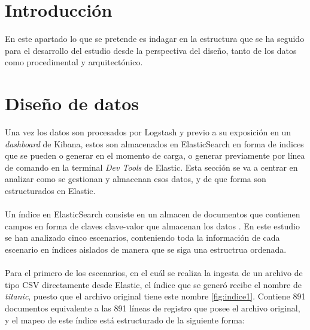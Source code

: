 
\section{Introducción}
En este apartado lo que se pretende es indagar en la estructura que se ha seguido para el desarrollo del estudio desde la perspectiva del diseño, tanto de los datos como procedimental y arquitectónico.

\section{Diseño de datos}
Una vez los datos son procesados por Logstash y previo a su exposición en un \textit{dashboard} de Kibana, estos son almacenados en ElasticSearch en forma de indices que se pueden o generar en el momento de carga, o generar previamente por línea de comando en la terminal \textit{Dev Tools} de Elastic. Esta sección se va a centrar en analizar como se gestionan y almacenan esos datos, y de que forma son estructurados en Elastic.

\paragraph{}

Un índice en ElasticSearch consiste en un almacen de documentos que contienen campos en forma de claves clave-valor que almacenan los datos \cite{indices}. En este estudio se han analizado cinco escenarios, conteniendo toda la información de cada escenario en índices aislados de manera que se siga una estructrua ordenada.

\paragraph{}
\paragraph{}
\paragraph{}


Para el primero de los escenarios, en el cuál se realiza la ingesta de un archivo de tipo CSV directamente desde Elastic, el índice que se generó recibe el nombre de \textit{titanic}, puesto que el archivo original tiene este nombre \ref{fig:indice1}. Contiene 891 documentos equivalente a las 891 líneas de registro que posee el archivo original, y el mapeo de este índice está estructurado de la siguiente forma:

